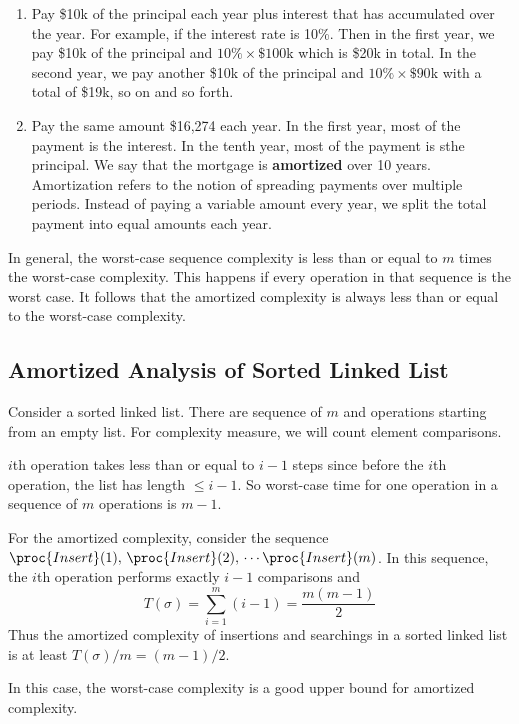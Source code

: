 \begin{enumerate}
    \item Pay \$10k of the principal each year plus interest that has accumulated over the year. For example, if the interest rate is 10\%. Then in the first year, we pay \$10k of the principal and $10\% \times \$100$k which is \$20k in total. In the second year, we pay another \$10k of the principal and $10\% \times \$90$k with a total of \$19k, so on and so forth.
    \item Pay the same amount \$16,274 each year. In the first year, most of the payment is the interest. In the tenth year, most of the payment is sthe principal. We say that the mortgage is \textbf{amortized} over 10 years. Amortization refers to the notion of spreading payments over multiple periods. Instead of paying a variable amount every year, we split the total payment into equal amounts each year.
\end{enumerate}

In general, the worst-case sequence complexity is less than or equal to $m$ times the worst-case complexity. This happens if every operation in that sequence is the worst case. It follows that the amortized complexity is always less than or equal to the worst-case complexity.

\subsection{Amortized Analysis of Sorted Linked List}

Consider a sorted linked list. There are sequence of $m$  and  operations starting from an empty list. For complexity measure, we will count element comparisons.

$i$th operation takes less than or equal to $i-1$ steps since before the $i$th operation, the list has length $\leq i-1$. So worst-case time for one operation in a sequence of $m$ operations is $m-1$.

For the amortized complexity, consider the sequence $\proc{Insert}(1), \, \proc{Insert}(2),\, \cdots \proc{Insert}(m)$. In this sequence, the $i$th operation performs exactly $i-1$ comparisons and
$$
T(\sigma) = \sum_{i=1}^m (i-1) = \frac{m(m-1)}{2}
$$
Thus the amortized complexity of insertions and searchings in a sorted linked list is at least $T(\sigma)/m = (m-1)/2$.

In this case, the worst-case complexity is a good upper bound for amortized complexity.

